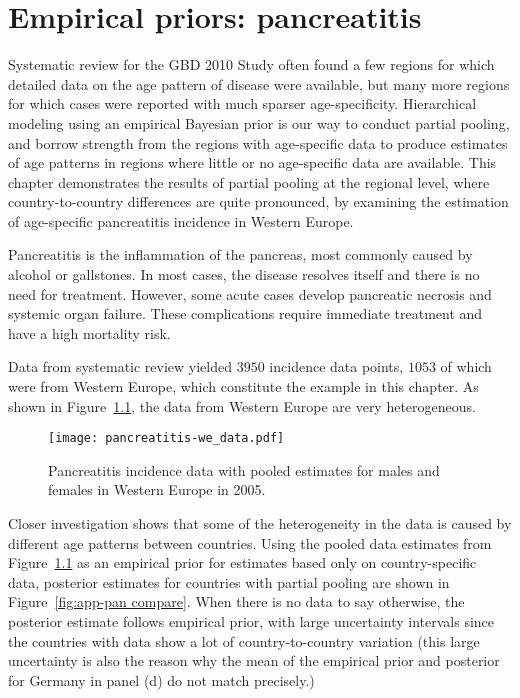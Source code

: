 \chapter{Empirical priors: pancreatitis}
\label{applications-priors_empirical}

Systematic review for the GBD 2010 Study often found a few regions for
which detailed data on the age pattern of disease were available, but
many more regions for which cases were reported with much sparser
age-specificity.  Hierarchical modeling using an empirical Bayesian
prior is our way to conduct partial pooling, and borrow strength from
the regions with age-specific data to produce estimates of age
patterns in regions where little or no age-specific data are
available.  This chapter demonstrates the results of partial pooling
at the regional level, where country-to-country differences are quite
pronounced, by examining the estimation of age-specific pancreatitis
incidence in Western Europe.

Pancreatitis is the inflammation of the pancreas, most commonly
caused by alcohol or gallstones.  In most cases, the disease resolves
itself and there is no need for treatment.  However, some acute
cases develop pancreatic necrosis and systemic organ failure.  These
complications require immediate treatment and have a high mortality risk.
\cite{raraty_acute_2004, banks_epidemiology_2002, sekimoto_JPN_2006}

Data from systematic review yielded $3950$ incidence data points,
$1053$ of which were from Western Europe, which constitute the example
in this chapter.  As shown in Figure~\ref{fig:app-pan data}, the data
from Western Europe are very heterogeneous.

    \begin{figure}[h]
        \begin{center}
            \texttt{[image: pancreatitis-we\_data.pdf]}
            \caption{Pancreatitis incidence data
              with pooled estimates for males and females in Western Europe in 2005.}
            \label{fig:app-pan data}
        \end{center}
    \end{figure}

Closer investigation shows that some of the heterogeneity in the data
is caused by different age patterns between countries.  Using the
pooled data estimates from Figure~\ref{fig:app-pan data} as an
empirical prior for estimates based only on country-specific data,
posterior estimates for countries with partial pooling are shown in
Figure~\ref{fig:app-pan compare}.  When there is no data to say
otherwise, the posterior estimate follows empirical prior, with large
uncertainty intervals since the countries with data show a lot of
country-to-country variation (this large uncertainty is also the
reason why the mean of the empirical prior and posterior for Germany
in panel (d) do not match precisely.)

